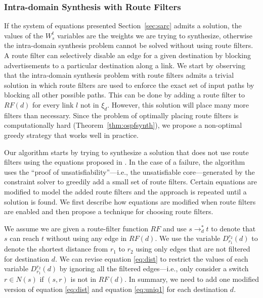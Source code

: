 \subsubsection{Intra-domain Synthesis with Route Filters} \label{sec:routefilter}

If the system of equations presented Section~\ref{sec:sarc} admits a solution, 
the values of the $W_s^t$ variables are the weights we are trying to synthesize,
otherwise the intra-domain synthesis problem cannot be solved without using route filters.
A route filter  can selectively disable an
edge for a given destination by  blocking advertisements to a
particular destination along a link.
We start by observing that the intra-domain synthesis problem with route filters
admits a trivial solution in which 
route filters are used to enforce the exact set of input paths by blocking all other possible paths.
This can be done by adding a 
route filter to $RF(d)$ for every link $l$ not in $\xi_d$. 
However, this solution will place many more filters than necessary.
Since the problem of optimally placing route filters is computationally hard (Theorem~\ref{thm:ospfsynth}), 
we propose a non-optimal greedy strategy that works well in practice.

Our algorithm starts by trying to synthesize a solution
that does not use route filters using the equations proposed in . 
In the case of a failure, the algorithm uses the ``proof of unsatisfiability''---i.e., the unsatisfiable core---generated by 
the constraint solver 
to greedily add a small set of route filters. 
Certain equations are modified to model the added route filters and the approach is repeated until a solution is found.
We first describe how  
equations are modified when
route filters are enabled and then propose a
technique for choosing route filters. 

We assume we are given a route-filter function $RF$ and 
use $s\rightarrow_d^* t$ to denote that $s$ can reach $t$
without using any edge in $RF(d)$.
We use the variable $D_{r_1}^{r_2}(d)$ to denote the shortest distance from $r_1$ to $r_2$
using only edges that are not filtered for destination $d$.
We can revise equation \eqref{eq:dist}   to restrict the values of 
each variable $D_{r_1}^{r_2}(d)$
by  ignoring all the filtered edges---i.e., only consider a switch $r\in N(s)$ if
$(s,r)$ is not in $RF(d)$. 
In summary, we need to add one modified version of equation \eqref{eq:dist} 
and equation  \eqref{eq:uniq1} for each destination $d$.

